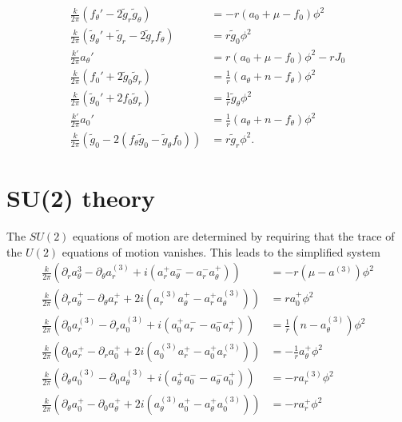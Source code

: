    \begin{align}
        \frac{k}{2 \pi } \left(f_{\theta}' - 2\tilde{g}_r \tilde{g}_{\theta}\right) &= -r \left(a_0 + \mu - f_0\right) \phi^2\\
        \frac{k}{2 \pi} \left(\tilde{g}_{\theta}' + \tilde{g}_r - 2 \tilde{g}_r f_{\theta} \right) & = r\tilde{g}_0 \phi^2 \\
        \frac{k'}{2 \pi} a_{\theta}' &= r \left(a_0 +\mu - f_0 \right)\phi^2 - rJ_0 \\
        \frac{k}{2\pi} \left(f_0'+2 \tilde{g}_0\tilde{g}_r\right) &= \frac{1}{r} \left(a_{\theta}+n - f_{\theta}\right)\phi^2 \\
        \frac{k}{2\pi}\left(\tilde{g}_0' + 2 f_0 \tilde{g}_r \right) &=\frac{1}{r} \tilde{g}_{\theta}\phi^2 \\
        \frac{k'}{2\pi} a_0'&= \frac{1}{r} \left(a_{\theta}+n - f_{\theta}\right) \phi^2 \\
        \frac{k}{2\pi} \left(\tilde{g}_0 - 2\left(f_{\theta} \tilde{g}_0 - \tilde{g}_{\theta} f_0\right)\right) &= r \tilde{g}_r \phi^2.
    \end{align}
\section{SU(2) theory}

The $SU(2)$ equations of motion are determined by requiring that the trace of the $U(2)$ equations of motion vanishes. This leads to the simplified system
    \begin{align}
        \frac{k}{2 \pi} \left(\partial_{r} a_{\theta}^3 - \partial_{\theta} a_r^{(3)} + i \left(a_r^+ a_{\theta}^- - a_r^- a_{\theta}^{+} \right) \right) &= -r \left(\mu - a^{(3)} \right)\phi^2 \\
        \frac{k}{2 \pi} \left(\partial_r a_{\theta}^{+} - \partial_{\theta} a_r^{+} +2i \left(a_r^{(3)} a_{\theta}^{+} - a_r^{+} a_{\theta}^{(3)} \right) \right) &=r a_0^{+} \phi^2  \\
        \frac{k}{2 \pi}\left(\partial_{0}a_r^{(3)} - \partial_r a_0^{(3)} + i \left(a_0^+ a_r^- - a_0^- a_r^+  \right)  \right) &= \frac{1}{r} \left(n - a_{\theta}^{(3)} \right) \phi^2  \\
        \frac{k}{2 \pi} \left( \partial_0 a_r^+ - \partial_r a_0^+ + 2i \left( a_0^{(3)} a_r^+ -a_0^+ a_r^{(3)} \right) \right) &= -\frac{1}{r} a_{\theta}^+ \phi^2  \\
        \frac{k}{2 \pi} \left(\partial_{\theta} a_0^{(3)} - \partial_0 a_{\theta}^{(3)} + i \left(a_{\theta}^+ a_0^- - a_{\theta}^- a_0^{+} \right) \right) &= -r  a_r^{(3)} \phi^2 \\
        \frac{k}{2 \pi} \left(\partial_{\theta} a_0^+ - \partial_0 a_{\theta}^+ + 2i \left(a_{\theta}^{(3)} a_0^+ - a_{\theta}^+ a_0^{(3)} \right) \right) &=-r a_r^+ \phi^2\\
    \end{align}




